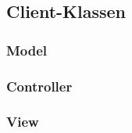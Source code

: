 \subsection{Client-Klassen}

\subsubsection{Model}

\subsubsection{Controller}

\subsubsection{View}